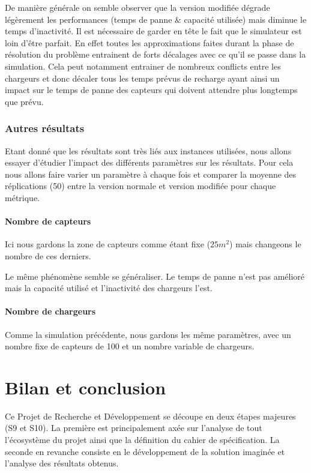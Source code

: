 \documentclass[final]{polytech/polytech}
\begin{document}
		De manière générale on semble observer que la version modifiée dégrade légèrement les performances (temps de panne \& capacité utilisée) mais diminue le temps d'inactivité.
		Il est nécessaire de garder en tête le fait que le simulateur est loin d'être parfait.
		En effet toutes les approximations faites durant la phase de résolution du problème entrainent de forts décalages avec ce qu'il se passe dans la simulation.
		Cela peut notamment entrainer de nombreux conflicts entre les chargeurs et donc décaler tous les temps prévus de recharge ayant ainsi un impact sur le temps de panne des capteurs qui doivent attendre plus longtemps que prévu.
		
		\subsection{Autres résultats}
			Etant donné que les résultats sont très liés aux instances utilisées, nous allons essayer d'étudier l'impact des différents paramètres sur les résultats.
			Pour cela nous allons faire varier un paramètre à chaque fois et comparer la moyenne des réplications (50) entre la version normale et version modifiée pour chaque métrique.
			
			\subsubsection{Nombre de capteurs}
				Ici nous gardons la zone de capteurs comme étant fixe ($25m^2$) mais changeons le nombre de ces derniers.
				
				
				Le même phénomène semble se généraliser.
				Le temps de panne n'est pas amélioré mais la capacité utilisé et l'inactivité des chargeurs l'est.
				
			\subsubsection{Nombre de chargeurs}
				Comme la simulation précédente, nous gardons les même paramètres, avec un nombre fixe de capteurs de 100 et un nombre variable de chargeurs.
	
\chapter{Bilan et conclusion}
	Ce Projet de Recherche et Développement se découpe en deux étapes majeures (S9 et S10).
	La première est principalement axée sur l'analyse de tout l'écosystème du projet ainsi que la définition du cahier de spécification.
	La seconde en revanche consiste en le développement de la solution imaginée et l'analyse des résultats obtenus.
	
\end{document}

